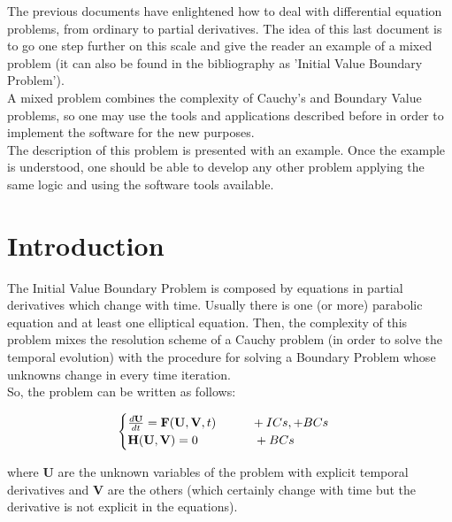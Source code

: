 
The previous documents have enlightened how to deal with differential
equation problems, from ordinary to partial derivatives. The idea of this last
document is to go one step further on this scale and give the reader an example
of a mixed problem (it can also be found in the bibliography as 'Initial Value
Boundary Problem'). \\

A mixed problem combines the complexity of Cauchy's and Boundary Value problems,
so one may use the tools and applications described before in order to implement
the software for the new purposes. \\

The description of this problem is presented with an example. Once the example
is understood, one should be able to develop any other problem applying the same
logic and using the software tools available. \\


\newpage

\section{Introduction}

The Initial Value Boundary Problem is composed by equations in partial
derivatives which change with time. Usually there is one (or more) parabolic
equation and at least one elliptical equation. Then, the complexity of this
problem mixes the resolution scheme of a Cauchy problem (in order to solve the
temporal evolution) with the procedure for solving a Boundary Problem whose
unknowns change in every time iteration. \\

So, the problem can be written as follows: 

$$\begin{cases}
\frac{d \mathbf{U}}{dt}= \mathbf{F}(\mathbf{U},\mathbf{V}, t) \hspace{1cm} +ICs,
+BCs\\

\mathbf{H}(\mathbf{U},\mathbf{V})=0 \hspace{1.6cm} +BCs\\
\end{cases}
$$

where $\mathbf{U}$ are the unknown variables of the problem with explicit
temporal derivatives and $\mathbf{V}$ are the others (which certainly change
with time but the derivative is not explicit in the equations).
\\

